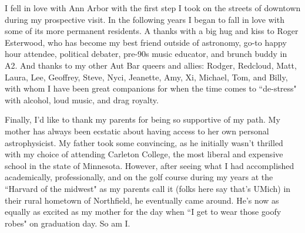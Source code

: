 I fell in love with Ann Arbor with the first step I took on the streets of downtown during my prospective visit. In the following years I began to fall in love with some of its more permanent residents. A thanks with a big hug and kiss to Roger Esterwood, who has become my best friend outside of astronomy, go-to happy hour attendee, political debater, pre-90s music educator, and brunch buddy in A2. And thanks to my other Aut Bar queers and allies: Rodger, Redcloud, Matt, Laura, Lee, Geoffrey, Steve, Nyci, Jeanette, Amy, Xi, Michael, Tom, and Billy, with whom I have been great companions for when the time comes to ``de-stress" with alcohol, loud music, and drag royalty.

Finally, I'd like to thank my parents for being so supportive of my path. My mother has always been ecstatic about having access to her own personal astrophysicist. My father took some convincing, as he initially wasn't thrilled with my choice of attending Carleton College, the most liberal and expensive school in the state of Minnesota. However, after seeing what I had accomplished academically, professionally, and on the golf course during my years at the ``Harvard of the midwest" as my parents call it (folks here say that's UMich) in their rural hometown of Northfield, he eventually came around. He's now as equally as excited as my mother for the day when ``I get to wear those goofy robes" on graduation day. So am I.
